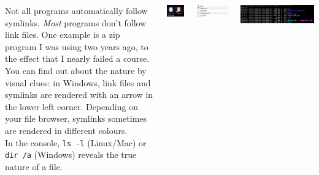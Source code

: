 \begin{frame}
%
\begin{columns}
\begin{hintbox}
	Not all programs automatically follow symlinks. \emph{Most} programs don't follow link files. One example is a zip program I was using two years ago, to the effect
	that I nearly failed a course.\\
	
	You can find out about the nature by visual clues: in Windows, link files and symlinks are rendered with an arrow in the lower left corner.
	Depending on your file browser, symlinks sometimes are rendered in different colours.\\
	
	In the console, \texttt{ls -l} (Linux/Mac) or \texttt{dir /a} (Windows) reveals the true nature of a file.
\end{hintbox}
%
	\begin{center}
		\includegraphics[width=.4\linewidth]{./gfx/link-folder}
	\end{center}
	
	\begin{center}
		\includegraphics[width=.8\linewidth]{./gfx/link-linux}
	\end{center}
	
	\begin{center}
		\includegraphics[width=1.\linewidth]{./gfx/link-konsole}
	\end{center}
	
	
\end{columns}
%
\end{frame}

